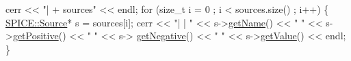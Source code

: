 \begin{DoxyCodeInclude}
        cerr << \textcolor{stringliteral}{"| + sources"} << endl;
        \textcolor{keywordflow}{for} (\textcolor{keywordtype}{size\_t} i = 0 ; i < sources.size() ; i++) \{
            \mbox{\hyperlink{class_s_p_i_c_e_1_1_source}{SPICE::Source}}* s = sources[i];
            cerr << \textcolor{stringliteral}{"| | "} <<  s->\mbox{\hyperlink{class_s_p_i_c_e_1_1_source_ac0fc966d4386ddb71d99361e3fccb311}{getName}}() << \textcolor{stringliteral}{" "} << s->\mbox{\hyperlink{class_s_p_i_c_e_1_1_source_a1adb347b9a2c2da556e4417ab0eec0e1}{getPositive}}() << \textcolor{stringliteral}{" "} << s->
      \mbox{\hyperlink{class_s_p_i_c_e_1_1_source_a8b4ab73ed1d99c533aa22af0a37ebb0d}{getNegative}}() << \textcolor{stringliteral}{" "} << s->\mbox{\hyperlink{class_s_p_i_c_e_1_1_source_a4c052cb2622c580a250b2c783a436882}{getValue}}() << endl;
        \}


\end{DoxyCodeInclude}
